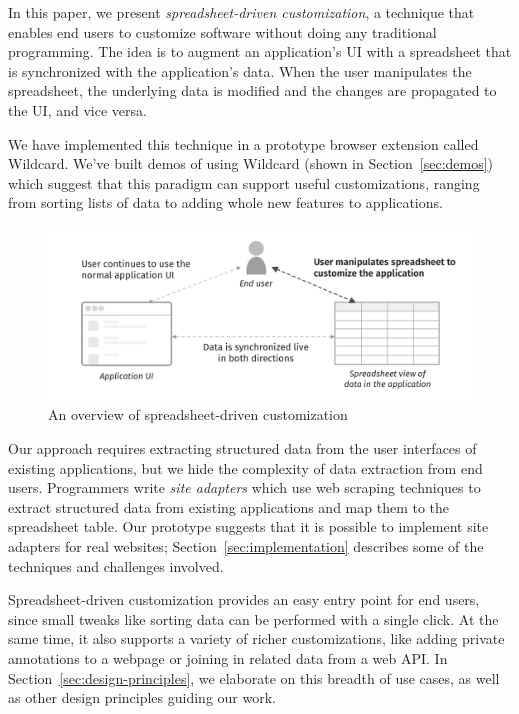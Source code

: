 \documentclass[english,submission]{programming}
\begin{document}
In this paper, we present \emph{spreadsheet-driven customization}, a
technique that enables end users to customize software without doing any
traditional programming. The idea is to augment an application's UI with
a spreadsheet that is synchronized with the application's data. When the
user manipulates the spreadsheet, the underlying data is modified and
the changes are propagated to the UI, and vice versa.

We have implemented this technique in a prototype browser extension
called Wildcard. We've built demos of using Wildcard (shown in
Section~\ref{sec:demos}) which suggest that this paradigm can support
useful customizations, ranging from sorting lists of data to adding
whole new features to applications.

\begin{figure}
\hypertarget{fig:overview}{%
\centering
\includegraphics{media/overview-300dpi.png}
\caption{An overview of spreadsheet-driven
customization}\label{fig:overview}
}
\end{figure}

Our approach requires extracting structured data from the user
interfaces of existing applications, but we hide the complexity of data
extraction from end users. Programmers write \emph{site adapters} which
use web scraping techniques to extract structured data from existing
applications and map them to the spreadsheet table. Our prototype
suggests that it is possible to implement site adapters for real
websites; Section~\ref{sec:implementation} describes some of the
techniques and challenges involved.

Spreadsheet-driven customization provides an easy entry point for end
users, since small tweaks like sorting data can be performed with a
single click. At the same time, it also supports a variety of richer
customizations, like adding private annotations to a webpage or joining
in related data from a web API. In Section~\ref{sec:design-principles},
we elaborate on this breadth of use cases, as well as other design
principles guiding our work.
\end{document}

